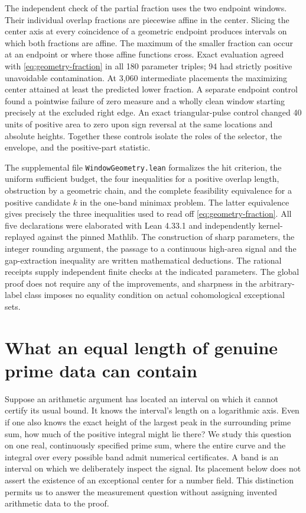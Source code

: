 \documentclass[12pt,letterpaper]{article}
\begin{document}
The independent check of the partial fraction uses the two endpoint windows. Their individual overlap fractions are piecewise affine in the center. Slicing the center axis at every coincidence of a geometric endpoint produces intervals on which both fractions are affine. The maximum of the smaller fraction can occur at an endpoint or where those affine functions cross. Exact evaluation agreed with \eqref{eq:geometry-fraction} in all 180 parameter triples; 94 had strictly positive unavoidable contamination. At 3,060 intermediate placements the maximizing center attained at least the predicted lower fraction. A separate endpoint control found a pointwise failure of zero measure and a wholly clean window starting precisely at the excluded right edge. An exact triangular-pulse control changed 40 units of positive area to zero upon sign reversal at the same locations and absolute heights. Together these controls isolate the roles of the selector, the envelope, and the positive-part statistic.

The supplemental file \texttt{WindowGeometry.lean} formalizes the hit criterion, the uniform sufficient budget, the four inequalities for a positive overlap length, obstruction by a geometric chain, and the complete feasibility equivalence for a positive candidate \(k\) in the one-band minimax problem. The latter equivalence gives precisely the three inequalities used to read off \eqref{eq:geometry-fraction}. All five declarations were elaborated with Lean 4.33.1 and independently kernel-replayed against the pinned Mathlib. The construction of sharp parameters, the integer rounding argument, the passage to a continuous high-area signal and the gap-extraction inequality are written mathematical deductions. The rational receipts supply independent finite checks at the indicated parameters. The global proof does not require any of the improvements, and sharpness in the arbitrary-label class imposes no equality condition on actual cohomological exceptional sets.


\section{What an equal length of genuine prime data can contain}
\label{sec:band-prime-design}

Suppose an arithmetic argument has located an interval on which it cannot certify its usual bound. It knows the interval's length on a logarithmic axis. Even if one also knows the exact height of the largest peak in the surrounding prime sum, how much of the positive integral might lie there? We study this question on one real, continuously specified prime sum, where the entire curve and the integral over every possible band admit numerical certificates. A band is an interval on which we deliberately inspect the signal. Its placement below does not assert the existence of an exceptional center for a number field. This distinction permits us to answer the measurement question without assigning invented arithmetic data to the proof.
\end{document}
